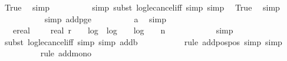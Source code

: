 \begin{isabellebody}
\ True\ \isamarkupfalse%
\ simp\isanewline
\ \ \ \ \ \ \ \ \isamarkupfalse%
\ {\isacharparenleft}{\kern0pt}simp{\isacharcomma}{\kern0pt}\ subst\ log{\isacharunderscore}{\kern0pt}le{\isacharunderscore}{\kern0pt}cancel{\isacharunderscore}{\kern0pt}iff{\isacharcomma}{\kern0pt}\ simp{\isacharcomma}{\kern0pt}\ simp{\isacharparenright}{\kern0pt}\ \isamarkupfalse%
\ True\ \isamarkupfalse%
\ simp\isanewline
\ \ \ \ \ \ \ \ \ \isamarkupfalse%
\ {\isacharparenleft}{\kern0pt}simp\ add{\isacharcolon}{\kern0pt}p{\isacharunderscore}{\kern0pt}ge{\isacharunderscore}{\kern0pt}{}{\isacharparenright}{\kern0pt}\isanewline
\ \ \ \ \ \ \ \ \isamarkupfalse%
\ a\ \isamarkupfalse%
\ simp\isanewline
\ \ \ \ \ \ \isamarkupfalse%
\ \isamarkupfalse%
\ {\isachardoublequoteopen}{\isachardot}{\kern0pt}{\isachardot}{\kern0pt}{\isachardot}{\kern0pt}\ {\isasymle}\ ereal\ {\isacharparenleft}{\kern0pt}{}\ {\isacharplus}{\kern0pt}\ {}\ {\isacharasterisk}{\kern0pt}\ real\ r\ {\isacharplus}{\kern0pt}\ {}\ {\isacharasterisk}{\kern0pt}\ log\ {}\ {\isacharparenleft}{\kern0pt}log\ {}\ {}\ {\isacharplus}{\kern0pt}\ log\ {}\ {\isacharparenleft}{\kern0pt}{}\ {\isacharasterisk}{\kern0pt}\ n\ {\isacharplus}{\kern0pt}\ {}{}{\isacharparenright}{\kern0pt}{\isacharparenright}{\kern0pt}{\isacharparenright}{\kern0pt}{\isachardoublequoteclose}\isanewline
\ \ \ \ \ \ \ \ \isamarkupfalse%
\ simp\isanewline
\ \ \ \ \ \ \ \ \isamarkupfalse%
\ {\isacharparenleft}{\kern0pt}subst\ log{\isacharunderscore}{\kern0pt}le{\isacharunderscore}{\kern0pt}cancel{\isacharunderscore}{\kern0pt}iff{\isacharcomma}{\kern0pt}\ simp{\isacharcomma}{\kern0pt}\ simp\ add{\isacharcolon}{\kern0pt}{\isacharunderscore}{\kern0pt}b{\isacharunderscore}{\kern0pt}{}{\isacharunderscore}{\kern0pt}{}{}{\isacharparenright}{\kern0pt}\isanewline
\ \ \ \ \ \ \ \ \ \isamarkupfalse%
\ {\isacharparenleft}{\kern0pt}rule\ add{\isacharunderscore}{\kern0pt}pos{\isacharunderscore}{\kern0pt}pos{\isacharcomma}{\kern0pt}\ simp{\isacharcomma}{\kern0pt}\ simp{\isacharparenright}{\kern0pt}\isanewline
\ \ \ \ \ \ \ \ \isamarkupfalse%
\ {\isacharparenleft}{\kern0pt}rule\ add{\isacharunderscore}{\kern0pt}mono{\isacharparenright}{\kern0pt}\isanewline
\ \ \ \ \ \ \ \ \ \isamarkupfalse%

\end{isabellebody}
